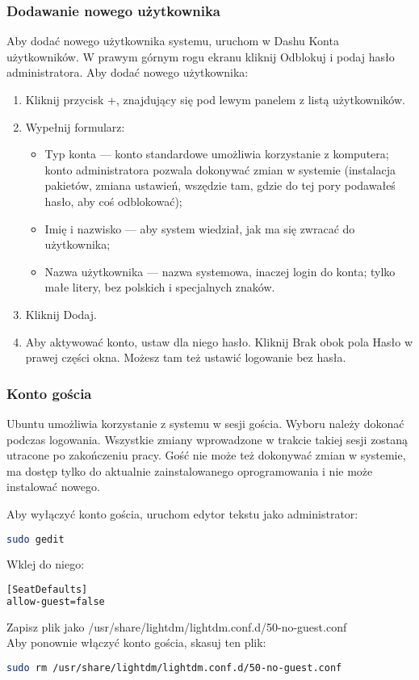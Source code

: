 \subsubsection{Dodawanie nowego użytkownika}
Aby dodać nowego użytkownika systemu, uruchom w Dashu \textcolor{ubuntu_orange}{Konta użytkowników}. W prawym górnym rogu ekranu kliknij \textcolor{ubuntu_orange}{Odblokuj} i podaj hasło administratora. Aby dodać nowego użytkownika:
\begin{enumerate}
\item Kliknij przycisk \textcolor{ubuntu_orange}{+}, znajdujący się pod lewym panelem z listą użytkowników.
\item Wypełnij formularz:
\begin{itemize}
\item \textcolor{ubuntu_orange}{Typ konta} --- konto standardowe umożliwia korzystanie z komputera; konto administratora pozwala dokonywać zmian w systemie (instalacja pakietów, zmiana ustawień, wszędzie tam, gdzie do tej pory podawałeś hasło, aby coś odblokować);
\item \textcolor{ubuntu_orange}{Imię i nazwisko} --- aby system wiedział, jak ma się zwracać do użytkownika;
\item \textcolor{ubuntu_orange}{Nazwa użytkownika} --- nazwa systemowa, inaczej login do konta; tylko małe litery, bez polskich i specjalnych znaków.
\end{itemize}
\item Kliknij \textcolor{ubuntu_orange}{Dodaj}.
\item Aby aktywować konto, ustaw dla niego hasło. Kliknij \textcolor{ubuntu_orange}{Brak} obok pola \textcolor{ubuntu_orange}{Hasło} w prawej części okna. Możesz tam też ustawić logowanie bez hasła.
\end{enumerate}

\subsubsection{Konto gościa}
Ubuntu umożliwia korzystanie z systemu w sesji gościa. Wyboru należy dokonać podczas logowania. Wszystkie zmiany wprowadzone w trakcie takiej sesji zostaną utracone po zakończeniu pracy. Gość nie może też dokonywać zmian w systemie, ma dostęp tylko do aktualnie zainstalowanego oprogramowania i nie może instalować nowego.

Aby wyłączyć konto gościa, uruchom edytor tekstu jako administrator:
\begin{lstlisting}[language=bash]
sudo gedit
\end{lstlisting}

Wklej do niego:

\begin{lstlisting}[language=bash]
[SeatDefaults]
allow-guest=false
\end{lstlisting}

Zapisz plik jako /usr/share/lightdm/lightdm.conf.d/50-no-guest.conf\\
Aby ponownie włączyć konto gościa, skasuj ten plik:

\begin{lstlisting}[language=bash]
sudo rm /usr/share/lightdm/lightdm.conf.d/50-no-guest.conf
\end{lstlisting}
